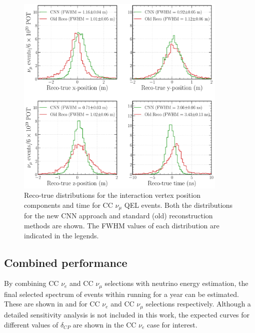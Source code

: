 \begin{figure} %
    \includegraphics[width=0.9\textwidth]{diagrams/7-results/final_vertex_numu_res_comparison.pdf}
    \caption[Reco-true distributions for the interaction vertex parameters for CC $\nu_{\mu}$ QEL
        events] {Reco-true distributions for the interaction vertex position components and time
        for CC $\nu_{\mu}$ QEL events. Both the distributions for the new CNN approach and
        standard (old) reconstruction methods are shown. The FWHM values of each distribution are
        indicated in the legends.}
    \label{fig:final_vertex_numu_res_comparison}
\end{figure}

\subsection{Combined performance} %
\label{sec:results_eval_combined} %

By combining CC $\nu_{e}$ and CC $\nu_{\mu}$ selections with neutrino energy estimation, the final
selected spectrum of events within \chipsfive running for a year can be estimated. These are shown
in  and 
for CC $\nu_{e}$ and CC $\nu_{\mu}$ selections respectively. Although a detailed \chipsfive
sensitivity analysis is not included in this work, the expected curves for different values of
$\delta_{CP}$ are shown in the CC $\nu_{e}$ case for interest.

